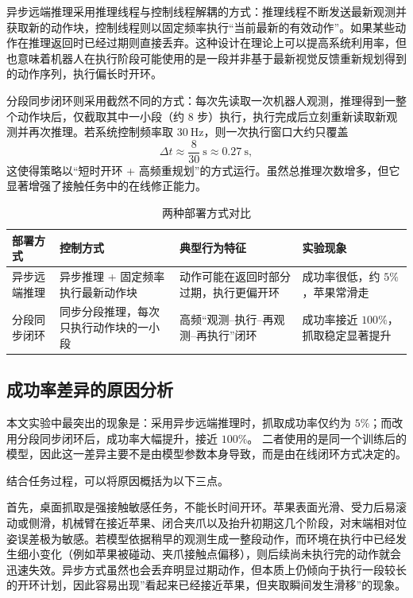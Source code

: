 异步远端推理采用推理线程与控制线程解耦的方式：推理线程不断发送最新观测并获取新的动作块，控制线程则以固定频率执行“当前最新的有效动作”。如果某些动作在推理返回时已经过期则直接丢弃。这种设计在理论上可以提高系统利用率，但也意味着机器人在执行阶段可能使用的是一段并非基于最新视觉反馈重新规划得到的动作序列，执行偏长时开环。

分段同步闭环则采用截然不同的方式：每次先读取一次机器人观测，推理得到一整个动作块后，仅截取其中一小段（约 8 步）执行，执行完成后立刻重新读取新观测并再次推理。若系统控制频率取 $30~\mathrm{Hz}$，则一次执行窗口大约只覆盖
\begin{equation}
  \Delta t \approx \frac{8}{30}\ \mathrm{s} \approx 0.27\ \mathrm{s},
\end{equation}
这使得策略以“短时开环 + 高频重规划”的方式运行。虽然总推理次数增多，但它显著增强了接触任务中的在线修正能力。

\begin{table}[htbp]
  \centering
  \small
  \caption{两种部署方式对比}
  \label{tab:deploy-compare}
  \begin{tabular}{>{\raggedright\arraybackslash}p{3.2cm}>{\raggedright\arraybackslash}p{3.6cm}>{\raggedright\arraybackslash}p{3.8cm}>{\raggedright\arraybackslash}p{2.8cm}}
    \toprule
    部署方式 & 控制方式 & 典型行为特征 & 实验现象 \\
    \midrule
    异步远端推理 & 异步推理 + 固定频率执行最新动作块 & 动作可能在返回时部分过期，执行更偏开环 & 成功率很低，约 $5\%$，苹果常滑走 \\
    分段同步闭环 & 同步分段推理，每次只执行动作块的一小段 & 高频“观测--执行--再观测--再执行”闭环 & 成功率接近 $100\%$，抓取稳定显著提升 \\
    \bottomrule
  \end{tabular}
\end{table}

\subsection{成功率差异的原因分析}

本文实验中最突出的现象是：采用异步远端推理时，抓取成功率仅约为 $5\%$；而改用分段同步闭环后，成功率大幅提升，接近 $100\%$。
二者使用的是同一个训练后的模型，因此这一差异主要不是由模型参数本身导致，而是由在线闭环方式决定的。

结合任务过程，可以将原因概括为以下三点。

首先，桌面抓取是强接触敏感任务，不能长时间开环。苹果表面光滑、受力后易滚动或侧滑，机械臂在接近苹果、闭合夹爪以及抬升初期这几个阶段，对末端相对位姿误差极为敏感。若模型依据稍早的观测生成一整段动作，而环境在执行中已经发生细小变化（例如苹果被碰动、夹爪接触点偏移），则后续尚未执行完的动作就会迅速失效。异步方式虽然也会丢弃明显过期动作，但本质上仍倾向于执行一段较长的开环计划，因此容易出现”看起来已经接近苹果，但夹取瞬间发生滑移”的现象。

